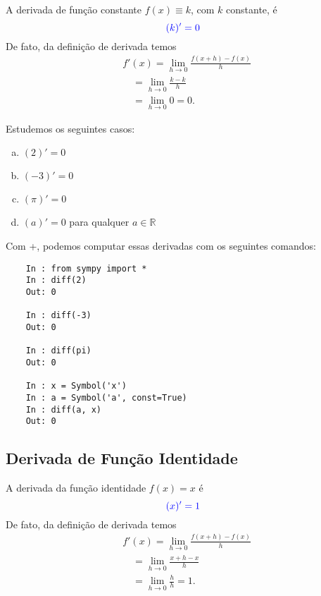A derivada de função constante $f(x) \equiv k$, com $k$ constante, é
\begin{equation}
  {\color{blue}(k)' = 0}
\end{equation}
De fato, da definição de derivada temos
\begin{align}
  & f'(x) = \lim_{h\to 0} \frac{f(x+h)-f(x)}{h}\\
  & \text{}\quad = \lim_{h\to 0} \frac{k-k}{h} \\
  & \text{}\quad = \lim_{h\to 0} 0 = 0.
\end{align}

\begin{ex}
  Estudemos os seguintes casos:
  \begin{enumerate}[a)]
  \item $(2)' = 0$
  \item $(-3)' = 0$
  \item $(\pi)' = 0$
  \item $(a)' = 0$ para qualquer $a\in\mathbb{R}$
  \end{enumerate}
  \ifispython
  Com {\python}+{\sympy}, podemos computar essas derivadas com os seguintes comandos:
  \begin{lstlisting}
    In : from sympy import *
    In : diff(2)
    Out: 0
    
    In : diff(-3)
    Out: 0

    In : diff(pi)
    Out: 0

    In : x = Symbol('x')
    In : a = Symbol('a', const=True)
    In : diff(a, x)
    Out: 0
  \end{lstlisting}
  \fi
\end{ex}

\subsection{Derivada de Função Identidade}

A derivada da função identidade $f(x) = x$ é
\begin{equation}
  {\color{blue}(x)' = 1}
\end{equation}
De fato, da definição de derivada temos
\begin{align}
  & f'(x) = \lim_{h\to 0} \frac{f(x+h)-f(x)}{h}\\
  & \text{}\quad = \lim_{h\to 0} \frac{x+h-x}{h}\\
  & \text{}\quad = \lim_{h\to 0} \frac{h}{h} = 1.\\
\end{align}

